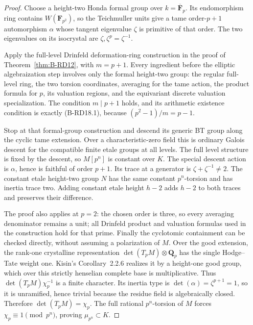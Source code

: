 \begin{proof}
Choose a height-two Honda formal group over
$k=\overline{\mathbf F}_p$. Its endomorphism ring contains
$W(\mathbf F_{p^2})$, so the Teichmuller units give a tame
order-$p+1$ automorphism $\alpha$ whose tangent eigenvalue $\zeta$
is primitive of that order. The two eigenvalues on its isocrystal
are $\zeta,\zeta^p=\zeta^{-1}$.

Apply the full-level Drinfeld deformation-ring construction in the
proof of Theorem~\ref{thm:B-RD12}, with $m=p+1$. Every ingredient
before the elliptic algebraization step involves only the formal
height-two group: the regular full-level ring, the two torsion
coordinates, averaging for the tame action, the product formula
for $p$, its valuation regions, and the equivariant discrete
valuation specialization. The condition $m\mid p+1$ holds, and its
arithmetic existence condition is exactly (B-RD18.1), because
$(p^2-1)/m=p-1$.

Stop at that formal-group construction and descend its generic BT
group along the cyclic tame extension. Over a characteristic-zero
field this is ordinary Galois descent for the compatible finite
etale groups at all levels. The full level structure is fixed by
the descent, so $M[p^n]$ is constant over $K$. The special descent
action is $\alpha$, hence is faithful of order $p+1$. Its trace at a
generator is $\zeta+\zeta^{-1}\ne2$.
The constant etale height-two group $N$ has the same constant
$p^n$-torsion and has inertia trace two. Adding constant etale
height $h-2$ adds $h-2$ to both traces and preserves their difference.

The proof also applies at $p=2$: the chosen order is three, so every
averaging denominator remains a unit; all Drinfeld product and
valuation formulas used in the construction hold for that prime.
Finally the cyclotomic containment can be checked directly, without
assuming a polarization of $M$. Over the good extension, the
rank-one crystalline representation $\det(T_pM)\otimes\mathbf Q_p$
has the single Hodge--Tate weight one. Kisin's
Corollary~2.2.6 realizes it by a height-one good group, which over
this strictly henselian complete base is multiplicative. Thus
$\det(T_pM)\chi_p^{-1}$ is a finite character. Its inertia type is
$\det(\alpha)=\zeta^{p+1}=1$, so it is unramified, hence trivial
because the residue field is algebraically closed. Therefore
$\det(T_pM)=\chi_p$. The full rational $p^n$-torsion of $M$ forces
$\chi_p\equiv1\pmod{p^n}$, proving $\mu_{p^n}\subset K$.
\end{proof}

